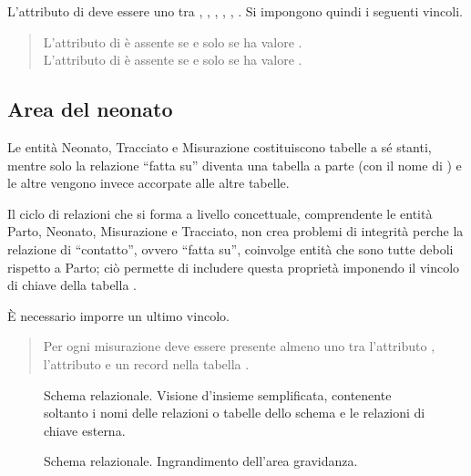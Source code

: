 L'attributo  di  deve essere uno tra , , , , , .
Si impongono quindi i seguenti vincoli.
\begin{quote}
L'attributo  di  è assente se e solo se  ha valore . \\
L'attributo  di  è assente se e solo se  ha valore .
\end{quote}

\subsection{Area del neonato}

Le entità Neonato, Tracciato e Misurazione costituiscono tabelle a sé stanti, mentre solo la relazione \enquote{fatta su} diventa una tabella a parte (con il nome di ) e le altre vengono invece accorpate alle altre tabelle.

Il ciclo di relazioni che si forma a livello concettuale, comprendente le entità Parto, Neonato, Misurazione e Tracciato, non crea problemi di integrità perche la relazione di \enquote{contatto}, ovvero \enquote{fatta su}, coinvolge entità che sono tutte deboli rispetto a Parto; ciò permette di includere questa proprietà imponendo il vincolo di chiave della tabella .

È necessario imporre un ultimo vincolo.
\begin{quote}
Per ogni misurazione deve essere presente almeno uno tra l'attributo , l'attributo  e un record nella tabella .
\end{quote}

\begin{figure}
    \centering
    
    \caption{Schema relazionale. Visione d'insieme semplificata, contenente soltanto i nomi delle relazioni o tabelle dello schema e le relazioni di chiave esterna.}
\label{completereldiagram}
\end{figure}

\begin{figure}
    \centering
    
    \caption{Schema relazionale. Ingrandimento dell'area gravidanza.}
\label{pregnancyreldiagram}
\end{figure}

